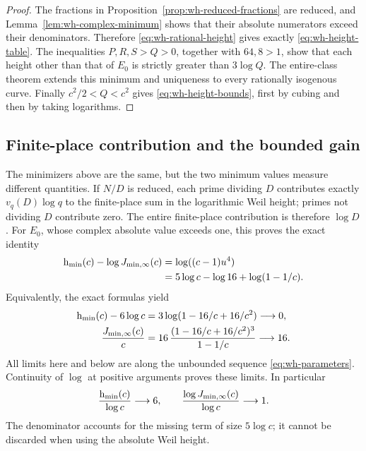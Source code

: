 \begin{proof}
The fractions in Proposition~\ref{prop:wh-reduced-fractions} are
reduced, and Lemma~\ref{lem:wh-complex-minimum} shows that their
absolute numerators exceed their denominators. Therefore
\eqref{eq:wh-rational-height} gives exactly
\eqref{eq:wh-height-table}.
The inequalities $P,R,S>Q>0$, together with $64,8>1$, show that
each height other than that of $E_0$ is strictly greater than
$3\log Q$. The entire-class theorem extends this minimum and
uniqueness to every rationally isogenous curve.
Finally $c^2/2<Q<c^2$ gives \eqref{eq:wh-height-bounds}, first
by cubing and then by taking logarithms.
\end{proof}

\subsection{Finite-place contribution and the bounded gain}

The minimizers above are the same, but the two minimum values
measure different quantities. If $N/D$ is reduced, each prime
dividing $D$ contributes exactly $v_q(D)\log q$ to the finite-place
sum in the logarithmic Weil height; primes not dividing $D$
contribute zero. The entire finite-place contribution is therefore
$\log D$. For $E_0$, whose complex absolute value exceeds one,
this proves the exact identity
\begin{equation}\label{eq:wh-finite-place-gap}
 \begin{aligned}
 \mathrm h_{\min}(c)-\log J_{\min,\infty}(c)
    &=\log((c-1)u^4)\\
    &=5\log c-\log16+\log(1-1/c).
 \end{aligned}
\end{equation}
Equivalently, the exact formulas yield
\begin{equation}\label{eq:wh-limits}
 \begin{aligned}
 \mathrm h_{\min}(c)-6\log c
    &=3\log(1-16/c+16/c^2)\longrightarrow0,\\
 \frac{J_{\min,\infty}(c)}c
    &=16\,\frac{(1-16/c+16/c^2)^3}{1-1/c}
       \longrightarrow16.
 \end{aligned}
\end{equation}
All limits here and below are along the unbounded sequence
\eqref{eq:wh-parameters}. Continuity of $\log$ at positive arguments
proves these limits. In particular
\[
 \frac{\mathrm h_{\min}(c)}{\log c}\longrightarrow6,\qquad
 \frac{\log J_{\min,\infty}(c)}{\log c}\longrightarrow1.
\]
The denominator accounts for the missing term of size $5\log c$;
it cannot be discarded when using the absolute Weil height.


